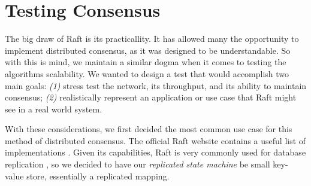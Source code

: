 \section{Testing Consensus}

	The big draw of Raft is its practicallity. It has allowed many the opportunity to implement distributed consensus, as it was designed to be understandable. So with this is mind, we maintain a similar dogma when it comes to testing the algorithms scalability. We wanted to design a test that would accomplish two main goals: \textit{(1)} stress test the network, its throughput, and its ability to maintain consensus; \textit{(2)} realistically represent an application or use case that Raft might see in a real world system.

	With these considerations, we first decided the most common use case for this method of distributed consensus. The official Raft website contains a useful list of implementations \cite{RaftSite}. Given its capabilities, Raft is very commonly used for database replication \cite{etcd, CockroachDB, TiKV, RethinkDB}, so we decided to have our \textit{replicated state machine} be small key-value store, essentially a replicated mapping.

